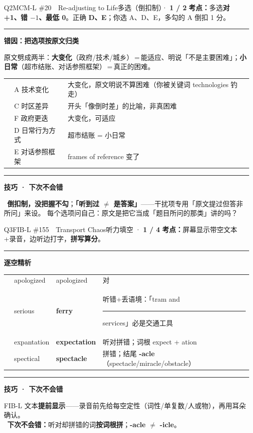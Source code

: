 \documentclass[11pt]{article}
\newcommand{\sfull}[1]{\textcolor{cFix}{\bfseries #1}}
\newcommand{\yes}{{\color{cFix}\ding{51}}}
\newcommand{\no}{{\color{cWrong}\ding{55}}}
\newcommand{\ptesub}[1]{%
  \par\needspace{2\baselineskip}\smallskip
  {\color{cAccent}\rule[-0.2ex]{3pt}{1.05em}}\hspace{6pt}%
  {\bfseries\color{cHead}#1}\par\nopagebreak\smallskip}
\begin{document}
\begin{qblock}{Q2\quad MCM-L \#20\ \ Re-adjusting to Life}{多选（倒扣制）· \textcolor{cAccent}{\bfseries 1 / 2}}
\textbf{考点：}多选\textbf{对 +1、错 $-1$、最低 0}。正确 \sfull{D、E}；你选 A、D、E，多勾的 A 倒扣 1 分。
\ptesub{错因：把选项按原文归类}
原文劈成两半：\textbf{大变化}（政府/技术/城乡）\,=\,能适应、明说「不是主要困难」；\textbf{小日常}（超市结账、对话参照框架）\,=\,真正的困难。
\begin{center}\small
\begin{tabular}{@{}clp{8.2cm}@{}}
\no & A 技术变化 & 大变化，原文明说不算困难（你被关键词 technologies 钓走）\\
\no & C 时区差异 & 开头「像倒时差」的比喻，非真困难 \\
\no & F 政府更迭 & 大变化，可适应 \\
\yes & D 日常行为方式 & 超市结账 = 小日常 \\
\yes & E 对话参照框架 & frames of reference 变了 \\
\end{tabular}
\end{center}
\ptesub{技巧 · 下次不会错}
\begin{notebox}\small
\yes\ \textbf{倒扣制，没把握不勾}；\textbf{「听到过 $\ne$ 是答案」}——干扰项专用「原文提过但答非所问」来设。
每个选项问自己：原文是把它当成「题目所问的那类」讲的吗？
\end{notebox}
\end{qblock}

\begin{qblock}{Q3\quad FIB-L \#155\ \ Transport Chaos}{听力填空 · \textcolor{cAccent}{\bfseries 1 / 4}}
\textbf{考点：}屏幕显示带空文本+录音，边听边打字，\textbf{拼写算分}。
\ptesub{逐空精析}
\begin{center}\small
\begin{tabular}{@{}cllp{7cm}@{}}
\yes & apologized & apologized & 对 \\
\no & serious & \textbf{ferry} & 听错+丢语境：「tram and \rule{0.8cm}{0.4pt} services」必是交通工具 \\
\no & expantation & \textbf{expectation} & 听对拼错；词根 expect + ation \\
\no & spectical & \textbf{spectacle} & 拼错；结尾 \textbf{-acle}（spectacle/miracle/obstacle）\\
\end{tabular}
\end{center}
\ptesub{技巧 · 下次不会错}
\begin{notebox}\small
FIB-L 文本\textbf{提前显示}——录音前先给每空定性（词性/单复数/人或物），再用耳朵确认。\\
\yes\ \textbf{下次不会错：}听对却拼错的词\textbf{按词根拼}；\textbf{-acle $\ne$ -icle}。
\end{notebox}
\end{qblock}
\end{document}
